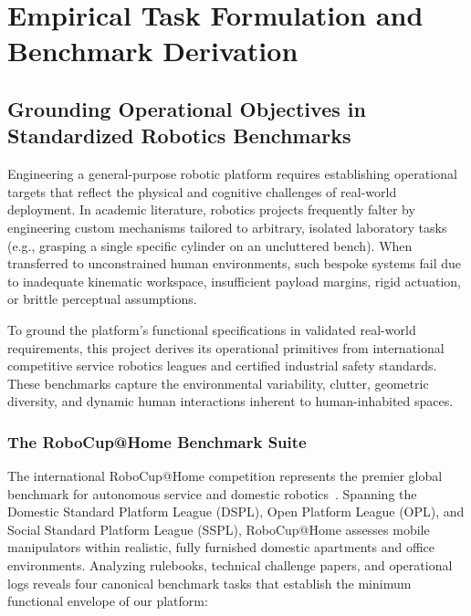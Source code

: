 \section{Empirical Task Formulation and Benchmark Derivation}
\label{sec:tasks_benchmarks}

\subsection{Grounding Operational Objectives in Standardized Robotics Benchmarks}
Engineering a general-purpose robotic platform requires establishing operational targets that reflect the physical and cognitive challenges of real-world deployment. In academic literature, robotics projects frequently falter by engineering custom mechanisms tailored to arbitrary, isolated laboratory tasks (e.g., grasping a single specific cylinder on an uncluttered bench). When transferred to unconstrained human environments, such bespoke systems fail due to inadequate kinematic workspace, insufficient payload margins, rigid actuation, or brittle perceptual assumptions.

To ground the platform's functional specifications in validated real-world requirements, this project derives its operational primitives from international competitive service robotics leagues and certified industrial safety standards. These benchmarks capture the environmental variability, clutter, geometric diversity, and dynamic human interactions inherent to human-inhabited spaces.

\subsubsection{The RoboCup@Home Benchmark Suite}
The international RoboCup@Home competition represents the premier global benchmark for autonomous service and domestic robotics~\cite{robocupathome}. Spanning the Domestic Standard Platform League (DSPL), Open Platform League (OPL), and Social Standard Platform League (SSPL), RoboCup@Home assesses mobile manipulators within realistic, fully furnished domestic apartments and office environments. Analyzing rulebooks, technical challenge papers, and operational logs reveals four canonical benchmark tasks that establish the minimum functional envelope of our platform:

